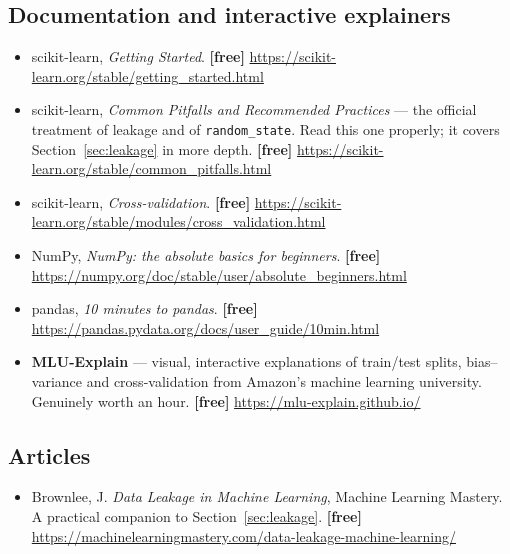 \documentclass[11pt]{article}
\begin{document}
\subsection*{Documentation and interactive explainers}

\begin{itemize}[leftmargin=*]
  \item scikit-learn, \emph{Getting Started}. \textbf{[free]}
    \url{https://scikit-learn.org/stable/getting_started.html}
  \item scikit-learn, \emph{Common Pitfalls and Recommended Practices} --- the
    official treatment of leakage and of \texttt{random\_state}. Read this one
    properly; it covers Section~\ref{sec:leakage} in more depth. \textbf{[free]}
    \url{https://scikit-learn.org/stable/common_pitfalls.html}
  \item scikit-learn, \emph{Cross-validation}. \textbf{[free]}
    \url{https://scikit-learn.org/stable/modules/cross_validation.html}
  \item NumPy, \emph{NumPy: the absolute basics for beginners}. \textbf{[free]}
    \url{https://numpy.org/doc/stable/user/absolute_beginners.html}
  \item pandas, \emph{10 minutes to pandas}. \textbf{[free]}
    \url{https://pandas.pydata.org/docs/user_guide/10min.html}
  \item \textbf{MLU-Explain} --- visual, interactive explanations of
    train/test splits, bias--variance and cross-validation from Amazon's machine
    learning university. Genuinely worth an hour. \textbf{[free]}
    \url{https://mlu-explain.github.io/}
\end{itemize}

\subsection*{Articles}

\begin{itemize}[leftmargin=*]
  \item Brownlee, J. \emph{Data Leakage in Machine Learning}, Machine Learning
    Mastery. A practical companion to Section~\ref{sec:leakage}. \textbf{[free]}
    \url{https://machinelearningmastery.com/data-leakage-machine-learning/}
\end{itemize}

\notesources{\AMLUnitISources}
\end{document}
